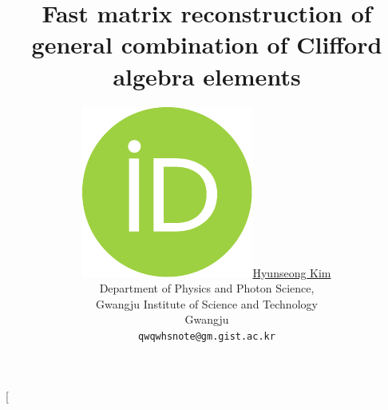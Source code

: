 \documentclass[twocolumn]{article}
\title{Fast matrix reconstruction of general combination of Clifford algebra elements
}
\author{
    \href{https://orcid.org/0000-0002-4876-7820}{
        \includegraphics[scale=0.06]{orcid.pdf}\hspace{1mm}Hyunseong Kim}\\
  Department of Physics and Photon Science,  \\
  Gwangju Institute of Science and Technology\\
  Gwangju\\
  \texttt{qwqwhsnote@gm.gist.ac.kr} \\
}
\begin{document}
\twocolumn[ 
\begin{@twocolumnfalse}
    \begin{center}

    \maketitle

\begin{abstract}




\end{abstract}
\end{center}
\end{@twocolumnfalse}
\end{document}
